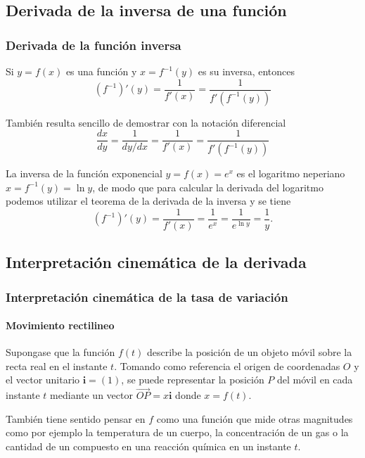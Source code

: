 \subsection{Derivada de la inversa de una función}
\begin{frame}
\frametitle{Derivada de la función inversa}
\begin{teorema}
Si $y=f(x)$ es una función y $x=f^{-1}(y)$ es su inversa, entonces
\[
\left(f^{-1}\right)'(y)=\frac{1}{f'(x)}=\frac{1}{f'(f^{-1}(y))}
\]
\end{teorema}

También resulta sencillo de demostrar con la notación diferencial
\[
\frac{dx}{dy}=\frac{1}{dy/dx}=\frac{1}{f'(x)}=\frac{1}{f'(f^{-1}(y))}
\]

 La inversa de la función exponencial $y=f(x)=e^x$ es el logaritmo neperiano $x=f^{-1}(y)=\ln y$, de modo que
para calcular la derivada del logaritmo podemos utilizar el teorema de la derivada de la inversa y se tiene
\[
\left(f^{-1}\right)'(y)=\frac{1}{f'(x)}=\frac{1}{e^x}=\frac{1}{e^{\ln y}}=\frac{1}{y}.
\]
\end{frame}


\subsection{Interpretación cinemática de la derivada}
\begin{frame}
\frametitle{Interpretación cinemática de la tasa de variación}
\framesubtitle{Movimiento rectilineo}
Supongase que la función $f(t)$ describe la posición de un objeto móvil sobre la recta real en el instante $t$.
Tomando como referencia el origen de coordenadas $O$ y el vector unitario $\mathbf{i}=(1)$, se puede representar la
posición $P$ del móvil en cada instante $t$ mediante un vector $\vec{OP}=x\mathbf{i}$ donde $x=f(t)$.
\begin{center}
\scalebox{1}{}
\end{center}

También tiene sentido pensar en $f$ como una función que mide otras magnitudes como por ejemplo la temperatura de un
cuerpo, la concentración de un gas o la cantidad de un compuesto en una reacción química en un instante $t$.
\end{frame}


